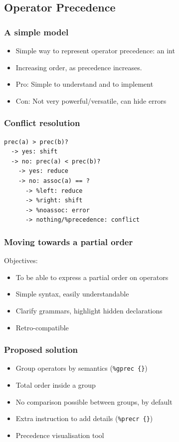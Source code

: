\documentclass{beamer}
\begin{document}
\subsection{Operator Precedence}
\begin{frame}
  \frametitle{A simple model}
    \begin{itemize}
      \item Simple way to represent operator precedence: an int
      \item Increasing order, as precedence increases.
      \item Pro: Simple to understand and to implement
      \item Con: Not very powerful/versatile, can hide errors
    \end{itemize}
\end{frame}

\begin{frame}[fragile]
  \frametitle{Conflict resolution}
\begin{verbatim}
prec(a) > prec(b)?
  -> yes: shift
  -> no: prec(a) < prec(b)?
    -> yes: reduce
    -> no: assoc(a) == ?
      -> %left: reduce
      -> %right: shift
      -> %noassoc: error
      -> nothing/%precedence: conflict
\end{verbatim}
\end{frame}


\begin{frame}
  \frametitle{Moving towards a partial order}
    Objectives:
    \begin{itemize}
      \item To be able to express a partial order on operators
      \item Simple syntax, easily understandable
      \item Clarify grammars, highlight hidden declarations
      \item Retro-compatible
    \end{itemize}
\end{frame}


\begin{frame}
  \frametitle{Proposed solution}
    \begin{itemize}
      \item Group operators by semantics (\texttt{\%gprec \{\}})
      \item Total order inside a group
      \item No comparison possible between groups, by default
      \item Extra instruction to add details (\texttt{\%precr \{\}})
      \item Precedence visualisation tool
    \end{itemize}
\end{frame}
\end{document}
